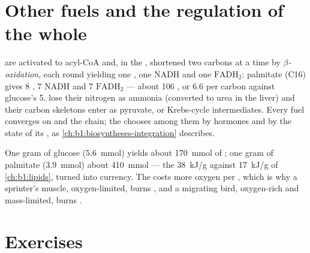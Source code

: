 \section{Other fuels and the regulation of the whole}

\begin{proposition}\label{prop:b1:respiration-fermentation:otherfuels}
 are activated to acyl-CoA and, in the , shortened two carbons at a time by \emph{$\beta$-oxidation},
each round yielding one , one NADH and one $\mathrm{FADH_2}$:
palmitate (C16) gives 8 , 7 NADH and 7 $\mathrm{FADH_2}$ ---
about 106 , or \qty{6.6}{}  per carbon against glucose's 5.
 lose their nitrogen as ammonia (converted to urea in the
liver) and their carbon skeletons enter as pyruvate,  or
Krebs-cycle intermediates. Every fuel converges on  and the
chain; the  chooses among them by hormones and by the state of its
, as \cref{ch:b1:biosyntheses-integration} describes.
\end{proposition}

\begin{example}\label{ex:b1:respiration-fermentation:gramofeach}
One gram of glucose (\qty{5.6}{mmol}) yields about \qty{170}{mmol} of
; one gram of palmitate (\qty{3.9}{mmol}) about \qty{410}{mmol} ---
the \qty{38}{kJ/g} against \qty{17}{kJ/g} of \cref{ch:b1:lipids},
turned into currency. The  costs more oxygen per , which is why
a sprinter's muscle, oxygen-limited, burns , and a migrating
bird, oxygen-rich and mass-limited, burns .
\end{example}

\section{Exercises}

